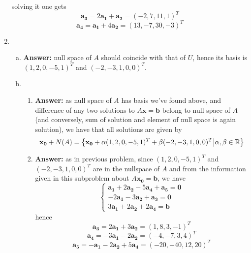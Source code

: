 \documentclass[8pt]{article} %
\begin{document}
\begin{enumerate}[1]
		solving it one gets
		\[\mathbf{a_3}=2\mathbf{a_1}+\mathbf{a_2}=(-2,7,11,1)^T\]
		\[\mathbf{a_4}=\mathbf{a_1}+4\mathbf{a_2}=(13,-7,30,-3)^T\]
	\item \begin{enumerate}[(a)]
	\item {\bf Answer: }null space of $A$ should coincide with that of $U$, hence its basis is $(1,2,0,-5,1)^T$ and $(-2,-3,1,0,0)^T$.
	\item \begin{enumerate}[\bf(i)]
		\item{\bf Answer: }as null space of $A$ has basis we've found above, and difference of any two solutions to $A\mathbf{x}=\mathbf{b}$
				belong to null space of $A$ (and conversely, sum of solution and element of null space is again solution),
				we have that all solutions are given by
				\[\mathbf{x_0}+N(A)=\left\{\mathbf{x_0}+\alpha(1,2,0,-5,1)^T+\beta(-2,-3,1,0,0)^T\big| \alpha,\beta\in\mathbb{R}\right\}\]
		\item{\bf Answer: }as in previous problem, since $(1,2,0,-5,1)^T$ and $(-2,-3,1,0,0)^T$ are in the nullspace of $A$
			and from the information given in this subproblem about $A\mathbf{x_0}=\mathbf{b}$, we have
			\[\begin{cases}\mathbf{a_1}+2\mathbf{a_2}-5\mathbf{a_4}+\mathbf{a_5}=\mathbf{0}\\-2\mathbf{a_1}-3\mathbf{a_2}+\mathbf{a_3}=
				\mathbf{0}\\3\mathbf{a_1}+2\mathbf{a_2}+2\mathbf{a_4}=\mathbf{b}\end{cases}\]
			hence
			\[\mathbf{a_3}=2\mathbf{a_1}+3\mathbf{a_2}=(1,8,3,-1)^T\]
			\[\mathbf{a_4}=-3\mathbf{a_1}-2\mathbf{a_2}=(-4,-7,3,4)^T\]
			\[\mathbf{a_5}=-\mathbf{a_1}-2\mathbf{a_2}+5\mathbf{a_4}=(-20,-40,12,20)^T\]
		\end{enumerate}
	\end{enumerate}
\end{enumerate}
\end{document}
